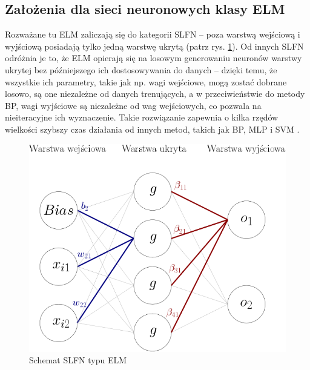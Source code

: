 \documentclass{article}
\begin{document}
\subsection{Założenia dla sieci neuronowych klasy ELM}
Rozważane tu ELM zaliczają się do kategorii SLFN -- poza warstwą wejściową i wyjściową posiadają tylko jedną warstwę ukrytą (patrz rys. \ref{schemat_elm}). Od innych SLFN odróżnia je to, że ELM opierają się na losowym generowaniu neuronów warstwy ukrytej bez późniejszego ich dostosowywania do danych -- dzięki temu, że wszystkie ich parametry, takie jak np. wagi wejściowe, mogą zostać dobrane losowo, są one niezależne od danych trenujących, a w przeciwieństwie do metody BP, wagi wyjściowe są niezależne od wag wejściowych, co pozwala na nieiteracyjne ich wyznaczenie. Takie rozwiązanie zapewnia o kilka rzędów wielkości szybszy czas działania od innych metod, takich jak BP, MLP i SVM \cite{akusok-hpelm}.
\begin{figure}[H]
\includegraphics[width=\textwidth]{schemat_sieci.png}
\caption{Schemat SLFN typu ELM}
\label{schemat_elm}
\end{figure}
\end{document}
